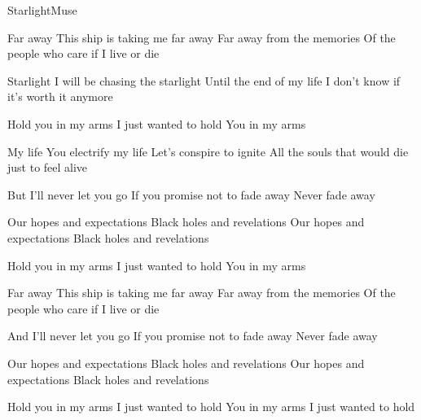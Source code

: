 \begin{Song}{Starlight}{Muse}

\begin{multicols}{2}
\begin{Verse}
Far away
This ship is taking me far away
Far away from the memories
Of the people who care if I live or die
\espaceInterStrophe

Starlight
I will be chasing the starlight
Until the end of my life
I don't know if it's worth it anymore
\end{Verse}
\espaceInterStrophe

\begin{Chorus}
Hold you in my arms
I just wanted to hold
You in my arms
\end{Chorus}
\espaceInterStrophe

\begin{Verse}
My life
You electrify my life
Let's conspire to ignite
All the souls that would die just to feel alive
\end{Verse}
\espaceInterStrophe

\begin{Bridge}
But I'll never let you go
If you promise not to fade away
Never fade away
\espaceInterStrophe

Our hopes and expectations
Black holes and revelations
Our hopes and expectations
Black holes and revelations
\end{Bridge}
\columnbreak

\begin{Chorus}
Hold you in my arms
I just wanted to hold
You in my arms
\end{Chorus}
\espaceInterStrophe

\begin{Verse}
Far away
This ship is taking me far away
Far away from the memories
Of the people who care if I live or die
\end{Verse}
\espaceInterStrophe

\begin{Bridge}
And I'll never let you go
If you promise not to fade away
Never fade away
\espaceInterStrophe

Our hopes and expectations
Black holes and revelations
Our hopes and expectations
Black holes and revelations
\end{Bridge}
\espaceInterStrophe

\begin{Chorus}
Hold you in my arms
I just wanted to hold
You in my arms
I just wanted to hold
\end{Chorus}


\end{multicols}
\end{Song}

